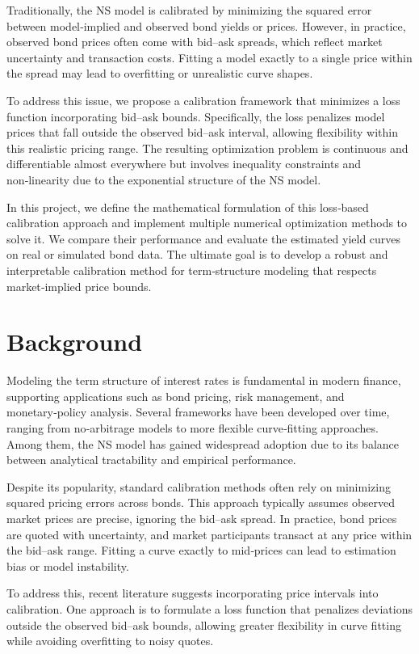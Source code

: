 \documentclass[12pt]{article}
\begin{document}
Traditionally, the NS model is calibrated by minimizing the squared error between model‑implied and observed bond yields or prices. However, in practice, observed bond prices often come with bid–ask spreads, which reflect market uncertainty and transaction costs. Fitting a model exactly to a single price within the spread may lead to overfitting or unrealistic curve shapes.

To address this issue, we propose a calibration framework that minimizes a loss function incorporating bid–ask bounds. Specifically, the loss penalizes model prices that fall outside the observed bid–ask interval, allowing flexibility within this realistic pricing range. The resulting optimization problem is continuous and differentiable almost everywhere but involves inequality constraints and non‑linearity due to the exponential structure of the NS model.

In this project, we define the mathematical formulation of this loss‑based calibration approach and implement multiple numerical optimization methods to solve it. We compare their performance and evaluate the estimated yield curves on real or simulated bond data. The ultimate goal is to develop a robust and interpretable calibration method for term‑structure modeling that respects market‑implied price bounds.

\section{Background}

Modeling the term structure of interest rates is fundamental in modern finance, supporting applications such as bond pricing, risk management, and monetary‑policy analysis. Several frameworks have been developed over time, ranging from no‑arbitrage models to more flexible curve‑fitting approaches. Among them, the NS model has gained widespread adoption due to its balance between analytical tractability and empirical performance.

Despite its popularity, standard calibration methods often rely on minimizing squared pricing errors across bonds. This approach typically assumes observed market prices are precise, ignoring the bid–ask spread. In practice, bond prices are quoted with uncertainty, and market participants transact at any price within the bid–ask range. Fitting a curve exactly to mid‑prices can lead to estimation bias or model instability.

To address this, recent literature suggests incorporating price intervals into calibration. One approach is to formulate a loss function that penalizes deviations outside the observed bid–ask bounds, allowing greater flexibility in curve fitting while avoiding overfitting to noisy quotes.
\end{document}
